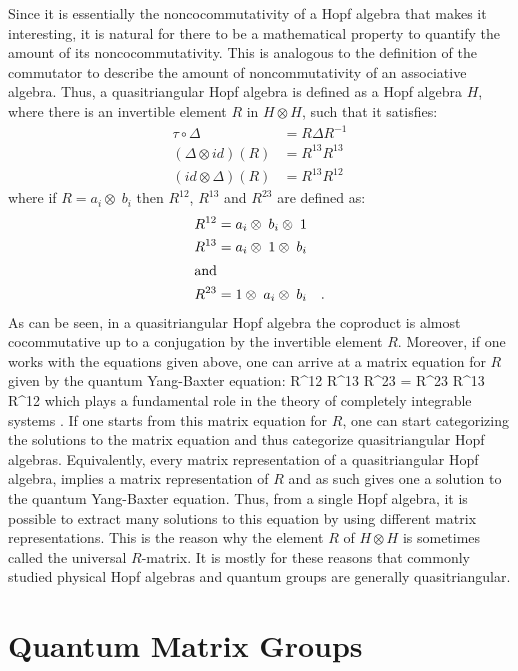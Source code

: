 Since it is essentially the noncocommutativity of a Hopf algebra that makes it interesting,
it is natural for there to be a mathematical property to quantify the amount of
its noncocommutativity. This is analogous to the definition of the commutator to describe
the amount of noncommutativity of an associative algebra. Thus, a quasitriangular Hopf
algebra is defined as a Hopf algebra $H$, where there is an invertible element $R$
in $H \otimes H$, such that it satisfies:
\begin{align}
\tau \circ \Delta & = R \Delta R^{-1} \\
(\Delta \otimes id)(R) & = R^{13} R^{13} \\
(id \otimes \Delta)(R) & = R^{13} R^{12}
\end{align}
where if $R = a_{i} \otimes\; b_{i}$ then $R^{12}$, $R^{13}$ and $R^{23}$ are defined as:
\begin{align}
R^{12} & = a_{i} \otimes\; b_{i} \otimes\; 1 \\
R^{13} & = a_{i} \otimes\; 1 \otimes\; b_{i} \\
\intertext{and}
R^{23} & = 1 \otimes\; a_{i} \otimes\; b_{i} \quad .
\end{align}
As can be seen, in a quasitriangular Hopf algebra the coproduct is almost cocommutative
up to a conjugation by the invertible element $R$. Moreover, if one works with
the equations given above, one can arrive at a matrix equation for $R$
given by the quantum Yang-Baxter equation:
\beq
R^{12} R^{13} R^{23} = R^{23} R^{13} R^{12}
\eeq
which plays a fundamental role in the theory of completely integrable systems \cite{qybe}.
If one starts from this matrix equation for $R$, one can start categorizing the solutions
to the matrix equation and thus categorize quasitriangular Hopf algebras. Equivalently,
every matrix representation of a quasitriangular Hopf algebra, implies a matrix representation
of $R$ and as such gives one a solution to the quantum Yang-Baxter equation. Thus, from
a single Hopf algebra, it is possible to extract many solutions to this equation by using
different matrix representations. This is the reason why the element $R$ of $H \otimes H$ is
sometimes called the universal $R$-matrix. It is mostly for these reasons that commonly
studied physical Hopf algebras and quantum groups are generally quasitriangular.

\section{Quantum Matrix Groups}

